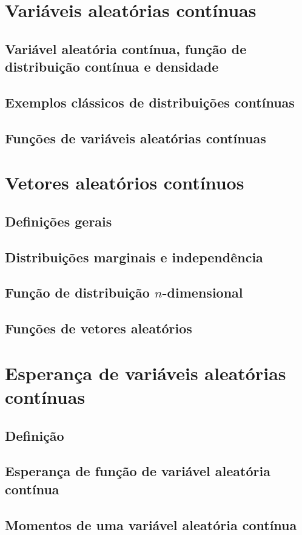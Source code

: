 \documentclass[../Notas.tex]{subfiles}
\begin{document}

\section{Variáveis aleatórias contínuas}

\subsection{Variável aleatória contínua, função de distribuição contínua e densidade}

\subsection{Exemplos clássicos de distribuições contínuas}

\subsection{Funções de variáveis aleatórias contínuas}

\section{Vetores aleatórios contínuos}

\subsection{Definições gerais}

\subsection{Distribuições marginais e independência}

\subsection{Função de distribuição $n$-dimensional}

\subsection{Funções de vetores aleatórios}

\section{Esperança de variáveis aleatórias contínuas}

\subsection{Definição}

\subsection{Esperança de função de variável aleatória contínua}

\subsection{Momentos de uma variável aleatória contínua}
\end{document}
